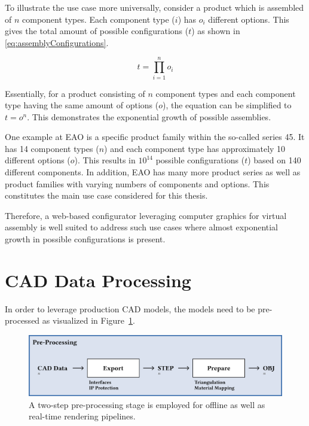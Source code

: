 To illustrate the use case more universally, consider a product which is assembled of $n$ component types. Each component type ($i$) has $o_i$ different options. This gives the total amount of possible configurations ($t$) as shown in \autoref{eq:assemblyConfigurations}.

\begin{equation}
  t = \prod_{i=1}^n o_i
  \label{eq:assemblyConfigurations}
\end{equation}

Essentially, for a product consisting of $n$ component types and each component type having the same amount of options ($o$), the equation can be simplified to $t = o^n$. This demonstrates the exponential growth of possible assemblies.

One example at EAO is a specific product family within the so-called series 45. It has 14 component types ($n$) and each component type has approximately 10 different options ($o$). This results in $10^{14}$ possible configurations ($t$) based on 140 different components. In addition, EAO has many more product series as well as product families with varying numbers of components and options. This constitutes the main use case considered for this thesis.

Therefore, a web-based configurator leveraging computer graphics for virtual assembly is well suited to address such use cases where almost exponential growth in possible configurations is present.

\section{CAD Data Processing}

In order to leverage production \gls{CAD} models, the models need to be pre-processed as visualized in Figure~\ref{fig:cad-preprocessing}. 

\begin{figure}[H]
  \centering
  \includegraphics[width=0.9\columnwidth]{resources/cad-pipeline-preprocessing.png}
  \caption{A two-step pre-processing stage is employed for offline as well as real-time rendering pipelines.}
  \label{fig:cad-preprocessing}
\end{figure}


